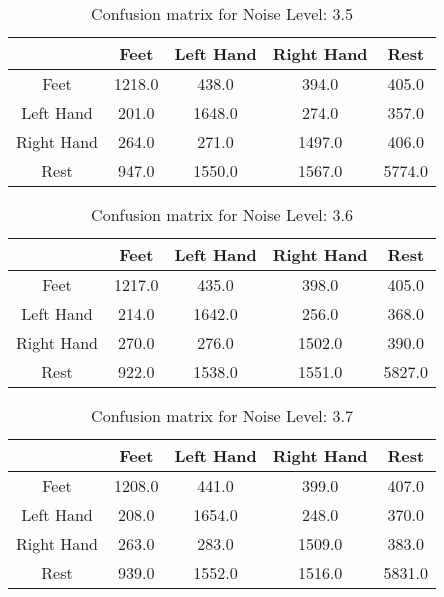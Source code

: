 \begin{table}[!htbp]
    \centering
    \begin{tabular}{|c||c|c|c|c|}
        \hline
		 & Feet & Left Hand & Right Hand & Rest \\
        \hline
        \hline
        Feet & 1218.0 & 438.0 & 394.0 & 405.0 \\
        \hline
        Left Hand & 201.0 & 1648.0 & 274.0 & 357.0 \\
        \hline
        Right Hand & 264.0 & 271.0 & 1497.0 & 406.0 \\
        \hline
        Rest & 947.0 & 1550.0 & 1567.0 & 5774.0 \\
        \hline
    \end{tabular}
    \caption{Confusion matrix for Noise Level: 3.5}
\end{table}

\begin{table}[!htbp]
    \centering
    \begin{tabular}{|c||c|c|c|c|}
        \hline
		 & Feet & Left Hand & Right Hand & Rest \\
        \hline
        \hline
        Feet & 1217.0 & 435.0 & 398.0 & 405.0 \\
        \hline
        Left Hand & 214.0 & 1642.0 & 256.0 & 368.0 \\
        \hline
        Right Hand & 270.0 & 276.0 & 1502.0 & 390.0 \\
        \hline
        Rest & 922.0 & 1538.0 & 1551.0 & 5827.0 \\
        \hline
    \end{tabular}
    \caption{Confusion matrix for Noise Level: 3.6}
\end{table}

\begin{table}[!htbp]
    \centering
    \begin{tabular}{|c||c|c|c|c|}
        \hline
		 & Feet & Left Hand & Right Hand & Rest \\
        \hline
        \hline
        Feet & 1208.0 & 441.0 & 399.0 & 407.0 \\
        \hline
        Left Hand & 208.0 & 1654.0 & 248.0 & 370.0 \\
        \hline
        Right Hand & 263.0 & 283.0 & 1509.0 & 383.0 \\
        \hline
        Rest & 939.0 & 1552.0 & 1516.0 & 5831.0 \\
        \hline
    \end{tabular}
    \caption{Confusion matrix for Noise Level: 3.7}
\end{table}

